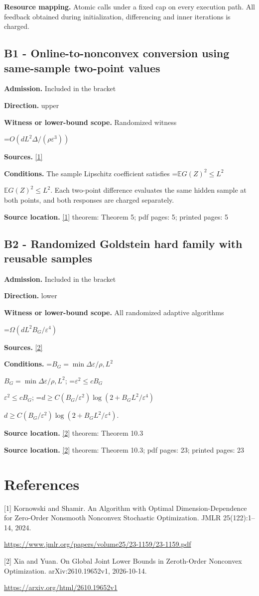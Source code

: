 \documentclass[10pt,a4paper]{article}
\newcommand{\AtlasMath}[1]{\par\begingroup\centering\setbox0=\hbox{$\displaystyle #1$}\ifdim\wd0>1.4\linewidth\typeout{ATLAS WIDE FORMULA: \the\wd0}\fi\ifdim\wd0>\linewidth\resizebox{\linewidth}{!}{\box0}\else\box0\fi\par\endgroup}
\newcommand{\AtlasInlineMath}[1]{\begingroup\setbox0=\hbox{$#1$}\ifdim\wd0>.4\linewidth\endgroup\AtlasMath{#1}\else\endgroup$#1$\fi}
\begin{document}
\textbf{Resource mapping.} Atomic calls under a fixed cap on every execution path. All feedback obtained during initialization, differencing and inner iterations is charged.

\subsection{B1 - Online-to-nonconvex conversion using same-sample two-point values}
\textbf{Admission.} Included in the bracket

\textbf{Direction.} upper

\textbf{Witness or lower-bound scope.} Randomized witness

\AtlasMath{O(dL^2\Delta/(\rho\varepsilon^3))}
\textbf{Sources.} \href{https://www.jmlr.org/papers/volume25/23-1159/23-1159.pdf}{[1]}

\textbf{Conditions.} The sample Lipschitz coefficient satisfies \AtlasInlineMath{\mathbb{E} G(Z)^2\le L^2}. Each two-point difference evaluates the same hidden sample at both points, and both responses are charged separately.

\textbf{Source location.} \href{https://www.jmlr.org/papers/volume25/23-1159/23-1159.pdf}{[1]} theorem: Theorem 5; pdf pages: 5; printed pages: 5

\subsection{B2 - Randomized Goldstein hard family with reusable samples}
\textbf{Admission.} Included in the bracket

\textbf{Direction.} lower

\textbf{Witness or lower-bound scope.} All randomized adaptive algorithms

\AtlasMath{\Omega(dL^2B_G/\varepsilon^4)}
\textbf{Sources.} \href{https://arxiv.org/html/2610.19652v1}{[2]}

\textbf{Conditions.} \AtlasInlineMath{B_G=\min{\Delta \varepsilon /\rho ,L^2}}; \AtlasInlineMath{\varepsilon ^2\le cB_G}; \AtlasInlineMath{d\ge C(B_G/\varepsilon ^2)\log(2+B_G L^2/\varepsilon ^4)}.

\textbf{Source location.} \href{https://arxiv.org/html/2610.19652v1}{[2]} theorem: Theorem 10.3

\textbf{Source location.} \href{https://arxiv.org/html/2610.19652v1}{[2]} theorem: Theorem 10.3; pdf pages: 23; printed pages: 23

\section{References}
[1] Kornowski and Shamir. An Algorithm with Optimal Dimension-Dependence for Zero-Order Nonsmooth Nonconvex Stochastic Optimization. JMLR 25(122):1--14, 2024.

\url{https://www.jmlr.org/papers/volume25/23-1159/23-1159.pdf}

[2] Xia and Yuan. On Global Joint Lower Bounds in Zeroth-Order Nonconvex Optimization. arXiv:2610.19652v1, 2026-10-14.

\url{https://arxiv.org/html/2610.19652v1}
\end{document}
